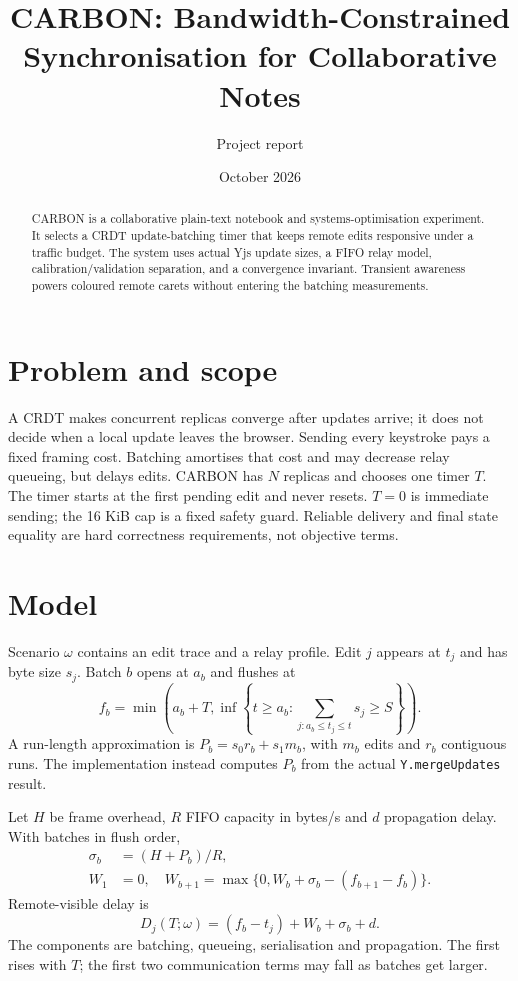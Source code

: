 \documentclass[10pt]{article}
\title{\textbf{CARBON: Bandwidth-Constrained Synchronisation for Collaborative Notes}}
\author{Project report}
\date{October 2026}
\begin{document}
\maketitle
\begin{abstract}
CARBON is a collaborative plain-text notebook and systems-optimisation experiment. It selects a CRDT update-batching timer that keeps remote edits responsive under a traffic budget. The system uses actual Yjs update sizes, a FIFO relay model, calibration/validation separation, and a convergence invariant. Transient awareness powers coloured remote carets without entering the batching measurements.
\end{abstract}
\section{Problem and scope}
A CRDT makes concurrent replicas converge after updates arrive; it does not decide when a local update leaves the browser. Sending every keystroke pays a fixed framing cost. Batching amortises that cost and may decrease relay queueing, but delays edits. CARBON has $N$ replicas and chooses one timer $T$. The timer starts at the first pending edit and never resets. $T=0$ is immediate sending; the 16 KiB cap is a fixed safety guard. Reliable delivery and final state equality are hard correctness requirements, not objective terms.

\section{Model}
Scenario $\omega$ contains an edit trace and a relay profile. Edit $j$ appears at $t_j$ and has byte size $s_j$. Batch $b$ opens at $a_b$ and flushes at
\begin{equation}
f_b=\min\left(a_b+T,\inf\left\{t\ge a_b:\sum_{j:a_b\le t_j\le t}s_j\ge S\right\}\right).
\end{equation}
A run-length approximation is $P_b=s_0r_b+s_1m_b$, with $m_b$ edits and $r_b$ contiguous runs. The implementation instead computes $P_b$ from the actual \texttt{Y.mergeUpdates} result.

Let $H$ be frame overhead, $R$ FIFO capacity in bytes/s and $d$ propagation delay. With batches in flush order,
\begin{align}
\sigma_b&=(H+P_b)/R,\\
W_1&=0,\quad W_{b+1}=\max\{0,W_b+\sigma_b-(f_{b+1}-f_b)\}.
\end{align}
Remote-visible delay is
\begin{equation}
D_j(T;\omega)=(f_b-t_j)+W_b+\sigma_b+d.
\end{equation}
The components are batching, queueing, serialisation and propagation. The first rises with $T$; the first two communication terms may fall as batches get larger.
\end{document}
